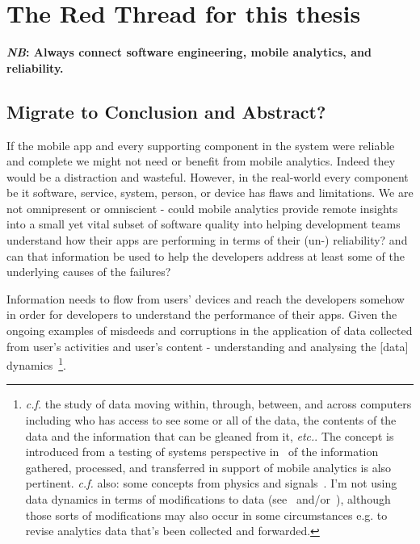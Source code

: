 \section{The Red Thread for this thesis}
\label{section_read_thread}
\textbf{\textit{NB}: Always connect software engineering, mobile analytics, and reliability.}

\subsection{Migrate to Conclusion and Abstract?}
If the mobile app and every supporting component in the system were reliable and complete we might not need or benefit from mobile analytics. Indeed they would be a distraction and wasteful. However, in the real-world every component be it software, service, system, person, or device has flaws and limitations. We are not omnipresent or omniscient - could mobile analytics provide remote insights into a small yet vital subset of software quality into helping development teams understand how their apps are performing in terms of their (un-) reliability? and can that information be used to help the developers address at least some of the underlying causes of the failures?

Information needs to flow from users' devices and reach the developers somehow in order for developers to understand the performance of their apps. Given the ongoing examples of misdeeds and corruptions in the application of data collected from user's activities and user's content - understanding and analysing the [data] dynamics~\footnote{\emph{c.f.} the study of data moving within, through, between, and across computers including who has access to see some or all of the data, the contents of the data and the information that can be gleaned from it, \emph{etc.}. The concept is introduced from a testing of systems perspective in~\citep{harty2020_fast_abstract_data_dynamics_for_testing_systems} of the information gathered, processed, and transferred in support of mobile analytics is also pertinent. \emph{c.f.} also: some concepts from physics and signals~\citep{BROOMHEAD1986_217_extracting_qualitative_dynamics_from_experimental_data}. I'm not using data dynamics in terms of modifications to data (see~\citep{wang2011_enabling_public_accountability_and_data_dynamics_etc} and/or~\citep{hao2011_privacy_preserving_etc_with_data_dynamics}), although those sorts of modifications may also occur in some circumstances e.g. to revise analytics data that's been collected and forwarded.}.

